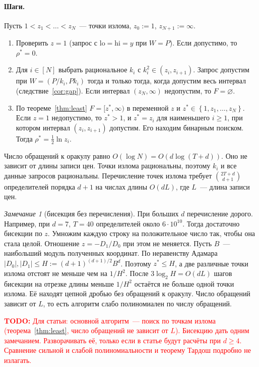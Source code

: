 \documentclass[a4paper,11pt]{article}
\theoremstyle{plain}
\theoremstyle{definition}
\theoremstyle{remark}
\newtheorem*{remark}{Замечание}
\newcommand{\abs}[1]{\left\lvert #1 \right\rvert}
\newcommand{\set}[1]{\left\{ #1 \right\}}
\newcommand{\todo}[1]{\textcolor{red}{\textbf{TODO:} #1}}
\begin{document}
\paragraph{Шаги.} Пусть $1<z_1<\dots<z_N$~--- точки излома, $z_0:=1$, $z_{N+1}:=\infty$.
\begin{enumerate}
    \item Проверить $z=1$ (запрос с $\mathrm{lo}=\mathrm{hi}=y$ при $W=P$). Если допустимо, то $\rho^*=0$.
    \item Для $i\in[N]$ выбрать рациональное $k_i$ с $k_i^2\in(z_i,z_{i+1})$. Запрос допустим при $W=(P/k_i,Pk_i)$ тогда и только тогда, когда допустим весь интервал (следствие~\ref{cor:gap}). Если интервал $(z_N,\infty)$ недопустим, то $F=\varnothing$.
    \item По теореме~\ref{thm:least} $F=[z^*,\infty)$ в переменной $z$ и $z^*\in\set{1,z_1,\dots,z_N}$. Если $z=1$ недопустимо, то $z^*>1$, и $z^*=z_i$ для наименьшего $i\ge1$, при котором интервал $(z_i,z_{i+1})$ допустим. Его находим бинарным поиском. Тогда $\rho^*=\tfrac12\ln z_i$.
\end{enumerate}
Число обращений к оракулу равно $O(\log N)=O(d\log(T+d))$. Оно не зависит от длины записи цен. Точки излома рациональны, поэтому $k_i$ и все данные запросов рациональны. Перечисление точек излома требует $\binom{2T+d}{d+1}$ определителей порядка $d+1$ на числах длины $O(dL)$, где $L$~--- длина записи цен.

\begin{remark}[бисекция без перечисления]
    При больших $d$ перечисление дорого. Например, при $d=7$, $T=40$ определителей около $6\cdot10^{10}$. Тогда достаточно бисекции по $z$. Умножим каждую строку на положительное число так, чтобы она стала целой. Отношение $z=-D_1/D_0$ при этом не меняется. Пусть $B$~--- наибольший модуль полученных координат. По неравенству Адамара $\abs{D_0},\abs{D_1}\le H:=(d+1)^{(d+1)/2}B^d$. Поэтому $z^*\le H$, а две различные точки излома отстоят не меньше чем на $1/H^2$. После $3\log_2H=O(dL)$ шагов бисекции на отрезке длины меньше $1/H^2$ остаётся не больше одной точки излома. Её находят цепной дробью без обращений к оракулу. Число обращений зависит от $L$, то есть алгоритм слабо полиномиален по числу обращений.
\end{remark}

\todo{Для статьи: основной алгоритм~--- поиск по точкам излома (теорема~\ref{thm:least}, число обращений не зависит от $L$). Бисекцию дать одним замечанием. Разворачивать её, только если в статье будут расчёты при $d\ge4$. Сравнение сильной и слабой полиномиальности и теорему Тардош подробно не излагать.}
\end{document}
